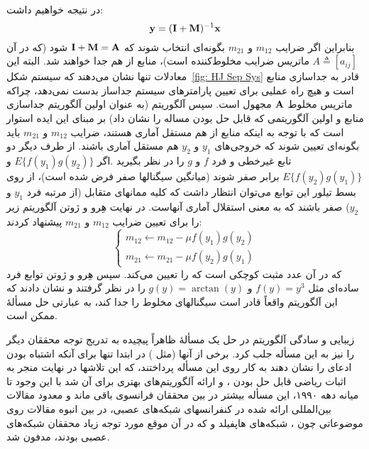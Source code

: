در نتیجه خواهیم داشت:
\begin{equation}
{\mathbf y} = ({\bf I} + {\mathbf M})^{-1} {\mathbf x}
\end{equation}
بنابراین اگر ضرایب $m_{12}$ و $m_{21}$ بگونه‌ای انتخاب شوند که ${\bf I}+{\mathbf M}={\mathbf A}$ 
شود (که در آن  $A\triangleq[a_{ij}]$ ماتریس ضرایب مخلوط‌کننده است)، 
منابع از هم جدا خواهند شد. البته این معادلات تنها نشان می‌دهند که سیستم 
شکل~\ref{fig: HJ Sep Sys} قادر به جداسازی منابع است و هیچ راه عملیی برای تعیین
پارامترهای سیستم جداساز بدست نمی‌دهد، چراکه ماتریس مخلوط  ${\mathbf A}$
مجهول است. سپس آلگوریتم  (به عنوان اولین آلگوریتم جداسازی منابع و اولین
آلگوریتمی که قابل حل بودن مساله  را نشان داد) بر مبنای این ایده استوار 
است که با توجه به اینکه منابع از هم مستقل آماری هستند، ضرایب  
$m_{12}$ و $m_{21}$ باید بگونه‌ای تعیین شوند که خروجی‌های $y_1$ و $y_2$ 
هم مستقل آماری باشند. از طرف دیگر دو تابع غیرخطی و فرد $f$ و $g$ را در 
نظر بگیرید .اگر $E\{f(y_1)g(y_2)\}$ و $E\{f(y_2)g(y_1)\}$  برابر صفر شوند
(میانگین سیگنالها صفر فرض شده است)، از روی بسط تیلور این توابع می‌توان انتظار
داشت که کلیه ممانهای متقابل (از مرتبه فرد $y_1$ و $y_2$) صفر باشند که به 
معنی استقلال آماری آنهاست. در نهایت  هِرو و ژوتن آلگوریتم زیر را برای تعیین ضرایب 
$m_{12}$ و  $m_{21}$ پیشنهاد کردند:
\begin{equation}
    \left\{
      \begin{array}{rcc}
        m_{12} \leftarrow m_{12} - \mu f(y_1) g(y_2) \\
        m_{21} \leftarrow m_{21} - \mu f(y_2) g(y_1)
      \end{array}
    \right.
\end{equation}
که در آن  عدد مثبت کوچکی است که   را تعیین می‌کند. سپس  هِرو و 
ژوتن توابع فرد ساده‌ای مثل $f(y)=y^3$ و $g(y)=\arctan(y)$ را در نظر گرفتند 
و نشان دادند که این آلگوریتم واقعاً قادر است سیگنالهای مخلوط را جدا کند، به عبارتی حل 
مسألهٔ  ممکن است. 

زیبایی و سادگی آلگوریتم  در حل یک مسألهٔ ظاهراً پیچیده به تدریج توجه
محققان دیگر را نیز به این مسأله جلب کرد. برخی از آنها (مثل  ) در
ابتدا تنها برای آنکه اشتباه بودن ادعای   را نشان دهند به کار روی این مسأله
پرداختند، که این تلاشها در نهایت منجر به اثبات ریاضی قابل حل بودن ، و
ارائه آلگوریتم‌های بهتری برای آن شد
با این وجود تا میانه دهه ۱۹۹۰، این مسأله بیشتر در بین محققان فرانسوی باقی
ماند و معدود مقالات بین‌المللی ارائه شده در کنفرانسهای شبکه‌های عصبی، در
بین انبوه مقالات روی موضوعاتی چون ، شبکه‌های هاپفیلد و
 که در آن موقع مورد توجه زیاد محققان
شبکه‌های عصبی بودند، مدفون شد.

